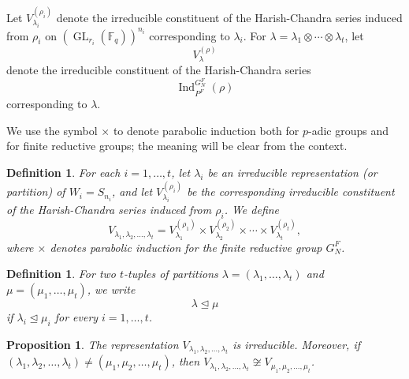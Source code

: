 \documentclass[12pt]{article}
\newtheorem{proposition}[theorem]{Proposition}
\newtheorem{definition}[theorem]{Definition}
\theoremstyle{remark}
\begin{document}
Let $V^{(\rho_i)}_{\lambda_i}$ denote the irreducible constituent of the Harish-Chandra series induced from $\rho_i$ on $(\operatorname{GL}_{r_i}(\mathbb{F}_q))^{n_i}$ corresponding to $\lambda_i$. For $\lambda = \lambda_1 \otimes \cdots \otimes \lambda_t$, let
$$
V^{(\rho)}_{\lambda}
$$
denote the irreducible constituent of the Harish-Chandra series
$$
\operatorname{Ind}_{P^F}^{G_N^F}(\rho)
$$
corresponding to $\lambda$.

We use the symbol $\times$ to denote parabolic induction both for $p$-adic groups and for finite reductive groups; the meaning will be clear from the context.

\begin{definition}
For each $i = 1,\dots,t$, let $\lambda_i$ be an irreducible representation (or partition) of $W_i = S_{n_i}$, and let $V^{(\rho_i)}_{\lambda_i}$ be the corresponding irreducible constituent of the Harish-Chandra series induced from $\rho_i$. We define
$$
V_{\lambda_1,\lambda_2,\dots,\lambda_t}
= V^{(\rho_1)}_{\lambda_1} \times V^{(\rho_2)}_{\lambda_2} \times \cdots \times V^{(\rho_t)}_{\lambda_t},
$$
where $\times$ denotes parabolic induction for the finite reductive group $G_N^F$.
\end{definition}

\begin{definition}
For two $t$-tuples of partitions $\lambda = (\lambda_1,\dots,\lambda_t)$ and $\mu = (\mu_1,\dots,\mu_t)$, we write
$$
\lambda \unlhd \mu
$$
if $\lambda_i \unlhd \mu_i$ for every $i = 1,\dots,t$.
\end{definition}

\begin{proposition}
The representation $V_{\lambda_1,\lambda_2,\dots,\lambda_t}$ is irreducible. Moreover, if $(\lambda_1,\lambda_2,\dots,\lambda_t) \neq (\mu_1,\mu_2,\dots,\mu_t)$, then $V_{\lambda_1,\lambda_2,\dots,\lambda_t} \not\cong V_{\mu_1,\mu_2,\dots,\mu_t}$.
\end{proposition}
\end{document}
